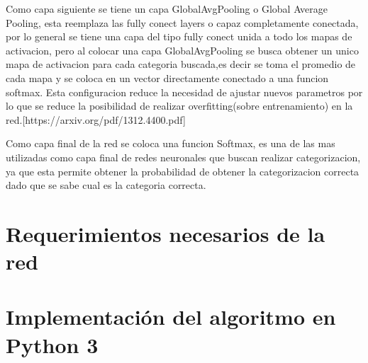 Como capa siguiente se tiene un capa GlobalAvgPooling o Global Average Pooling, esta reemplaza las fully conect layers o capaz completamente 
conectada, por lo general se tiene una capa del tipo fully conect unida a todo los mapas de activacion, pero al colocar una capa GlobalAvgPooling
se busca obtener un unico mapa de activacion para cada categoria buscada,es decir se toma el promedio de cada mapa y se coloca en un vector directamente 
conectado a una funcion softmax. Esta configuracion reduce la necesidad de ajustar nuevos parametros por lo que se reduce la posibilidad de 
realizar overfitting(sobre entrenamiento) en la red.[https://arxiv.org/pdf/1312.4400.pdf]

Como capa final de la red se coloca una funcion Softmax, es una de las mas utilizadas como capa final de redes neuronales que buscan realizar
categorizacion, ya que esta permite obtener la probabilidad de obtener la categorizacion correcta dado que se sabe cual es la categoria correcta.
 
\section{Requerimientos necesarios de la red}

\section{Implementación del algoritmo en Python 3}
